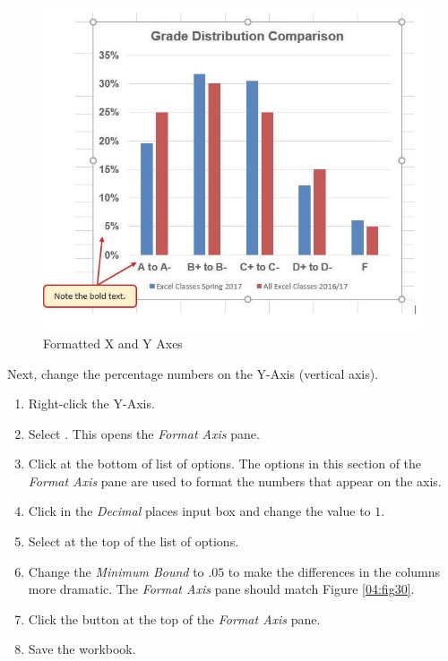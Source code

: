 \begin{figure}[H]
	\centering
	\includegraphics[width=\maxwidth{.95\linewidth}]{gfx/ch04_fig29}
	\caption{Formatted X and Y Axes}
	\label{04:fig29}
\end{figure}

Next, change the percentage numbers on the Y-Axis (vertical axis).

\begin{enumbox}
	\begin{enumerate}
		\item Right-click the Y-Axis. 
		\item Select . This opens the \textit{Format Axis} pane.
		\item Click  at the bottom of list of options. The options in this section of the \textit{Format Axis} pane are used to format the numbers that appear on the axis.
		\item Click in the \textit{Decimal} places input box and change the value to $ 1 $.
		\item Select  at the top of the list of options. 
		\item Change the \textit{Minimum Bound} to $ .05 $ to make the differences in the columns more dramatic. The \textit{Format Axis} pane should match Figure \ref{04:fig30}.
		\item Click the  button at the top of the \textit{Format Axis} pane.
		\item Save the  workbook.
	\end{enumerate}
\end{enumbox}
	
